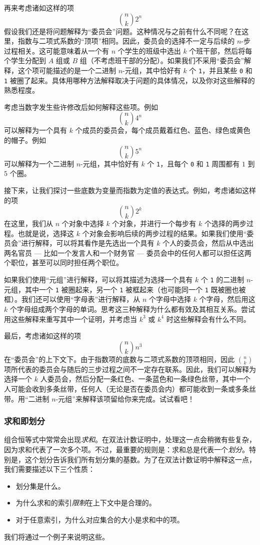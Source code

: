 再来考虑诸如这样的项
\[{n \choose k}2^n\]
假设我们还是将问题解释为``委员会''问题。这种情况与之前有什么不同呢？在这里，指数与二项式系数的``顶项''相同。因此，委员会的选择不一定与后续的 $n$-步过程相关。这可能意味着从一个有 $n$ 个学生的班级中选出 $k$ 个班干部，然后将每个学生分配到 $A$ 组或 $B$ 组（不考虑班干部的分配）。如果我们不采用``委员会''解释，这个项可能描述的是一个二进制 $n$-元组，其中恰好有 $k$ 个 \verb|1|，并且某些 \verb|0| 和 \verb|1| 被圈了起来。具体用哪种方法解释取决于问题的具体情况，以及你对这些解释的熟悉程度。

考虑当数字发生些许修改后如何解释这些项。例如
\[{n \choose k}4^n\]
可以解释为一个具有 $k$ 个成员的委员会，每个成员戴着红色、蓝色、绿色或黄色的帽子。例如
\[{n \choose k}5^n\]
可以解释为一个二进制 $n$-元组，其中恰好有 $k$ 个 \verb|1|，且每个 \verb|0| 和 \verb|1| 周围都有 $1$ 到 $5$ 个圈。

接下来，让我们探讨一些底数为变量而指数为定值的表达式。例如，考虑诸如这样的项
\[{n \choose k}2^k\]
在这里，我们从 $n$ 个对象中选择 $k$ 个对象，并进行一个每步有 $k$ 个选择的两步过程。也就是说，选择这 $k$ 个对象会影响后续的两步过程的结果。如果我们使用``委员会''进行解释，可以将其看作是先选出一个具有 $k$ 个人的委员会，然后从中选出两名官员 --- 比如一个发言人和一个财务官 --- 委员会中的任何人都可以担任这两个职位，甚至可以同时担任两个职位。

如果我们使用``元组''进行解释，可以将其描述为选择一个具有 $k$ 个 \verb|1| 的二进制 $n$-元组，其中一个 \verb|1| 被圈起来，另一个 \verb|1| 被框起来（也可能同一个 \verb|1| 既被圈也被框）。我们还可以使用``字母表''进行解释，从 $n$ 个字母中选择 $k$ 个字母，然后用这 $k$ 个字母组成两个字母的单词。思考这三种解释为什么都有效及其相互关系。尝试用这些解释来重写其中一个证明，并考虑当 $k^3$ 或 $k^4$ 时这些解释会有什么不同。

最后，考虑诸如这样的项
\[{n \choose k}n^3\]
在``委员会''的上下文下。由于指数项的底数与二项式系数的顶项相同，因此 ${n \choose k}$ 项所代表的委员会与随后的三步过程之间不一定存在联系。因此，我们可以解释为选择一个 $k$ 人委员会，然后分配一条红色、一条蓝色和一条绿色丝带，其中一个人可能会收到多条丝带，任何人（无论是否在委员会内）都可能收到一条或多条丝带。用``二进制 $n$-元组''来解释该项留给你来完成。试试看吧！

\subsubsection*{求和即划分}

组合恒等式中常常会出现\emph{求和}。在双法计数证明中，处理这一点会稍微有些复杂，因为求和代表了一次多个项。不过，最重要的规则是：求和总是代表一个\emph{划分}。特别是，这个划分告诉我们所有划分集的基数。为了在双法计数证明中解释这一点，我们需要描述以下三个性质：
\begin{itemize}
    \item 划分集是什么。
    \item 为什么求和的索引\emph{限制}在上下文中是合理的。
    \item 对于任意索引，为什么对应集合的大小是求和中的项。
\end{itemize}
我们将通过一个例子来说明这些。\\


